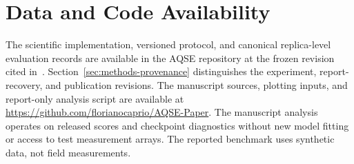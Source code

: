 \section*{Data and Code Availability}
The scientific implementation, versioned protocol, and canonical replica-level evaluation records are available in the AQSE repository at the frozen revision cited in~\cite{aqse2026canonical}. Section~\ref{sec:methods-provenance} distinguishes the experiment, report-recovery, and publication revisions. The manuscript sources, plotting inputs, and report-only analysis script are available at \url{https://github.com/florianocaprio/AQSE-Paper}. The manuscript analysis operates on released scores and checkpoint diagnostics without new model fitting or access to test measurement arrays. The reported benchmark uses synthetic data, not field measurements.
